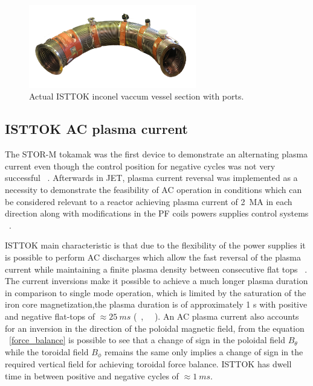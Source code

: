 \begin{figure}[htbp]
	\centering
	\includegraphics[width=0.65\textwidth]{Chp4/VacuumVessel_Low.png}
	\caption{\label{VV_IST} Actual ISTTOK inconel  vaccum vessel section with ports.  }
\end{figure}





\subsection{ISTTOK AC plasma current}


The STOR-M tokamak was the first device to demonstrate an alternating plasma current even though the control position for negative cycles was not very successful ~\cite{Mitarai1996}. Afterwards in JET, plasma current reversal was implemented as a necessity to demonstrate the feasibility of AC operation in conditions which can be considered relevant to a reactor achieving plasma current of 2~MA in each direction along with modifications in the PF coils powers supplies control systems ~\cite{Tubbing1992}.\smallskip

 ISTTOK  main characteristic  is that due to the flexibility of the power supplies it is possible  to perform  AC  discharges  which  allow the fast reversal of the plasma current while maintaining a finite plasma density between consecutive flat tops  ~\cite{density}. The current inversions make it possible to achieve a much longer plasma duration in comparison to single mode operation, which is limited by the saturation of the iron core magnetization,the plasma duration is of approximately 1 s with positive and negative flat-tops of $\approx 25~ms$ (~\cite{Fernandes1998}, ~\cite{Carvalho2015}~). An AC plasma current also accounts for  an inversion in the direction of the poloidal magnetic field, from the equation ~\ref{force_balance} is possible to see that a change of sign in the poloidal field $B_\theta$ while the toroidal field $B_{\phi}$ remains the same only implies a change of sign in the required vertical field for achieving toroidal force balance. ISTTOK has dwell time in between positive and negative cycles of $\approx 1~ms$.\smallskip


